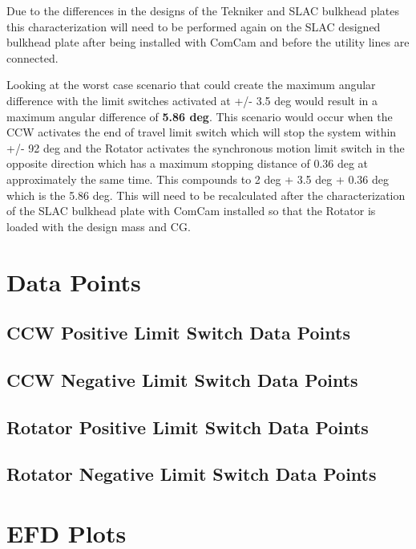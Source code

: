 \documentclass[SE,lsstdraft,authoryear,toc]{lsstdoc}
\begin{document}
Due to the differences in the designs of the Tekniker and SLAC bulkhead
plates this characterization will need to be performed again on the SLAC
designed bulkhead plate after being installed with ComCam and before the
utility lines are connected.

Looking at the worst case scenario that could create the maximum angular
difference with the limit switches activated at +/- 3.5 deg would result
in a maximum angular difference of \textbf{5.86 deg}. This scenario
would occur when the CCW activates the end of travel limit switch which
will stop the system within +/- 92 deg and the Rotator activates the
synchronous motion limit switch in the opposite direction which has a
maximum stopping distance of 0.36 deg at approximately the same time.
This compounds to 2 deg + 3.5 deg + 0.36 deg which is the 5.86 deg. This
will need to be recalculated after the characterization of the SLAC
bulkhead plate with ComCam installed so that the Rotator is loaded with
the design mass and CG.

\appendix
\section{Data Points}
\subsection{CCW Positive Limit Switch Data Points}
\subsection{CCW Negative Limit Switch Data Points}
\subsection{Rotator Positive Limit Switch Data Points}
\subsection{Rotator Negative Limit Switch Data Points}

\section{EFD Plots}
\end{document}
